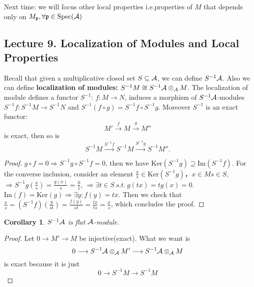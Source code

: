 \documentclass[11pt]{article}
\newtheorem{cor}[thm]{Corollary}
\newcommand{\scp}{{\mathfrak p}}
\newcommand{\cala}{{\cal A}}
\newcommand{\Lrta}{\Longrightarrow}
\newcommand{\lrta}{\longrightarrow}
\begin{document}
Next time: we will focus other local properties i.e.properties of $M$ that depends only on  $M_\scp, \forall \scp\in \text{Spec}(\cala)$



\subsection{Lecture 9. Localization of Modules and Local Properties}
Recall that given a multiplicative closed set 
$S\subseteq \cala$, we can define  $S^{-1}\cala$.
Also we can define \textbf{localization of modules:} $S^{-1}M\cong S^{-1}\cala\otimes_\cala M$. The localization of module defines a functor $S^{-1}$:
$f:M\lrta N$, induces a morphism of $S^{-1}\cala$-modules $S^{-1}f:S^{-1}M\lrta S^{-1}N$ and $S^{-1}(f\circ g)=S^{-1}f\circ S^{-1}g$. Moreover $S^{-1}$ is an exact functor:
$$
M'\overset{f}{\lrta}M\overset{g}{\lrta}M''
$$
is exact, then so is 
$$
S^{-1}M\overset{S^{-1}f}{\lrta }S^{-1}M\overset{S^{-1}g}{\lrta } S^{-1}M''.
$$

\begin{proof}
$g\circ f=0\Lrta S^{-1}g\circ S^{-1}f=0$, then we have $\text{Ker}(S^{-1}g)\supseteq \text{Im}(S^{-1}f)$. For the converse inclusion, consider an element $\frac{x}{s}\in \text{Ker}(S^{-1}g)，x\in M s\in S$, $\Lrta S^{-1}g(\frac{x}{s})=\frac{g(x)}{s}=\frac{0}{1}$, $\Lrta \exists t\in S\ s.t. \ g(tx)=tg(x)=0$. $\text{Im}(f)=\text{Ker}(g)\Lrta\exists y: f(y)=tx$. Then we check that $\frac{x}{s}=(S^{-1}f)(\frac{y}{st})=\frac{f(y)}{st}=\frac{tx}{ts}=\frac{x}{s}$, which concludes the proof.
\end{proof}

\begin{cor}
$S^{-1}\cala$ is flat $\cala$-module.
\end{cor}
\begin{proof}
Let $0\lrta M'\lrta M$ be injective(exact). What we want is 
$$
0\lrta S^{-1}\cala\otimes_\cala M'\lrta S^{-1
}\cala\otimes _\cala M
$$
is exact because it is just 
$$
0\lrta S^{-1}M\lrta S^{-1}M
$$
\end{proof}
\end{document}

